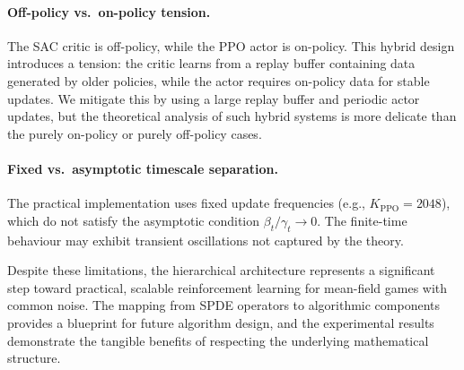 \paragraph{Off-policy vs.\ on-policy tension.} The SAC critic is off-policy, while
the PPO actor is on-policy. This hybrid design introduces a tension: the critic
learns from a replay buffer containing data generated by older policies, while the
actor requires on-policy data for stable updates. We mitigate this by using a large
replay buffer and periodic actor updates, but the theoretical analysis of such hybrid
systems is more delicate than the purely on-policy or purely off-policy cases.

\paragraph{Fixed vs.\ asymptotic timescale separation.} The practical implementation
uses fixed update frequencies (e.g., $K_{\mathrm{PPO}} = 2048$), which do not
satisfy the asymptotic condition $\beta_t/\gamma_t \to 0$. The finite-time behaviour
may exhibit transient oscillations not captured by the theory.

Despite these limitations, the hierarchical architecture represents a significant
step toward practical, scalable reinforcement learning for mean-field games with
common noise. The mapping from SPDE operators to algorithmic components provides a
blueprint for future algorithm design, and the experimental results demonstrate the
tangible benefits of respecting the underlying mathematical structure.

\begin{table}[ht]
\centering
\small
\caption{Summary of Limitations and Mitigations}
\label{tab:limitations-summary}
\end{table}


